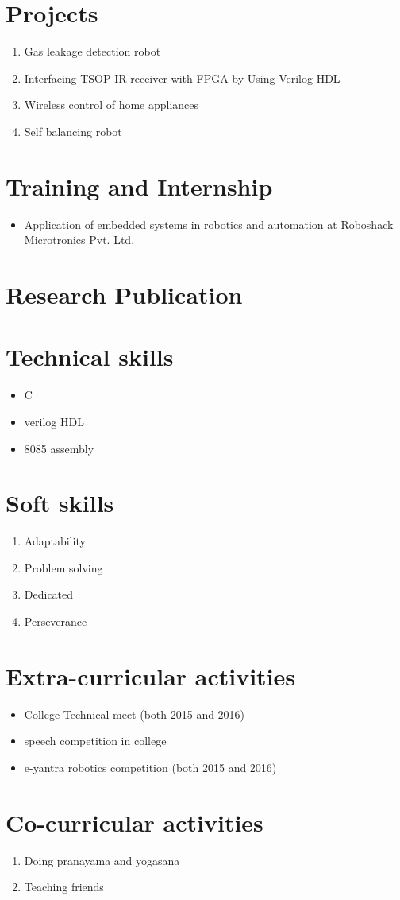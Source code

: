 \documentclass[11pt]{article}
\begin{document}
\section*{Projects}  
\begin{enumerate}
	\item Gas leakage detection robot
	\item Interfacing TSOP IR receiver with FPGA by Using Verilog HDL
	\item Wireless control of home appliances
	\item Self balancing robot
\end{enumerate}	
\section*{Training and Internship}  
\begin{itemize}
	\item	Application of embedded systems in robotics and automation at Roboshack Microtronics Pvt. Ltd. 
\end{itemize}
\section*{Research Publication}
\section*{Technical skills}   
\begin{itemize}
	\item C
	\item verilog HDL
	\item 8085 assembly
\end{itemize} 	
\section*{Soft skills}  
\begin{enumerate}
	\item Adaptability
	\item Problem solving
	\item Dedicated
	\item Perseverance
\end{enumerate}
\section*{Extra-curricular activities}  
\begin{itemize}
	\item College Technical meet (both 2015 and 2016)
	\item speech competition in college
	\item e-yantra robotics competition (both 2015 and 2016)
\end{itemize}
\section*{Co-curricular activities}  
\begin{enumerate}
	\item Doing pranayama and yogasana
	\item Teaching friends
\end{enumerate}
\end{document}
